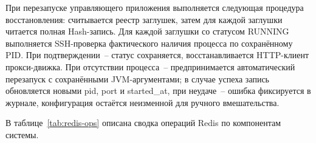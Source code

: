 При перезапуске управляющего приложения выполняется следующая процедура восстановления: считывается реестр заглушек, затем для каждой заглушки читается полная Hash-запись. Для каждой заглушки со статусом RUNNING выполняется SSH-проверка фактического наличия процесса по сохранённому PID. При подтверждении~-- статус сохраняется, восстанавливается HTTP-клиент прокси-движка. При отсутствии процесса~-- предпринимается автоматический перезапуск с сохранёнными JVM-аргументами; в случае успеха запись обновляется новыми pid, port и started\_at, при неудаче~-- ошибка фиксируется в журнале, конфигурация остаётся неизменной для ручного вмешательства.

В таблице~\ref{tab:redis-ops} описана сводка операций Redis по компонентам системы.



